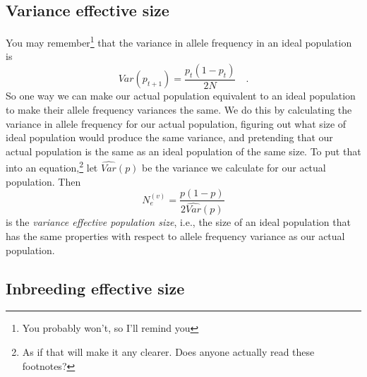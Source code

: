 \subsection*{Variance effective size}

You may remember\footnote{You probably won't, so I'll remind you} that
the variance in allele frequency in an ideal population is
\[
Var(p_{t+1}) = \frac{p_t(1-p_t)}{2N} \quad.
\]
So one way we can make our actual population equivalent to an ideal
population to make their allele frequency variances the same. We do
this by calculating the variance in allele frequency for our actual
population, figuring out what size of ideal population would produce
the same variance, and pretending that our actual population is the
same as an ideal population of the same size. To put that into an
equation,\footnote{As if that will make it any clearer. Does anyone
  actually read these footnotes?} let $\widehat{Var}(p)$ be the
variance we calculate for our actual population. Then
\[
N_e^{(v)} = \frac{p(1-p)}{2\widehat{Var}(p)}
\]
is the {\it variance effective population size}, i.e., the size of an
ideal population that has the same properties with respect to allele
frequency variance as our actual population.

\subsection*{Inbreeding effective size}

